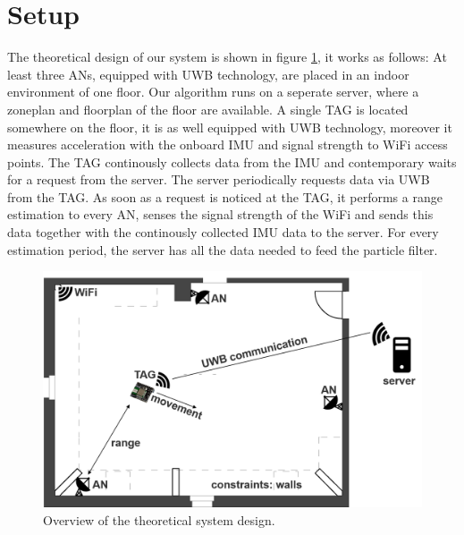 
\section{Setup}
The theoretical design of our system is shown in figure \ref{fig:system_design}, it works as follows:
At least three ANs, equipped with UWB technology, are placed in an indoor environment of one floor. Our algorithm runs on a seperate server, where a zoneplan and floorplan of the floor are available. A single TAG is located somewhere on the floor, it is as well equipped with UWB technology, moreover it measures acceleration with the onboard IMU and signal strength to WiFi access points. The TAG continously collects data from the IMU and contemporary waits for a request from the server. The server periodically requests data via UWB from the TAG. As soon as a request is noticed at the TAG, it performs a range estimation to every AN, senses the signal strength of the WiFi and sends this data together with the continously collected IMU data to the server.
For every estimation period, the server has all the data needed to feed the particle filter.

\begin{figure}[th]
\centering
\includegraphics[width=1.0\textwidth]{Figures/system_design}
\decoRule
\caption[System Design]{Overview of the theoretical system design.}
\label{fig:system_design}
\end{figure}


